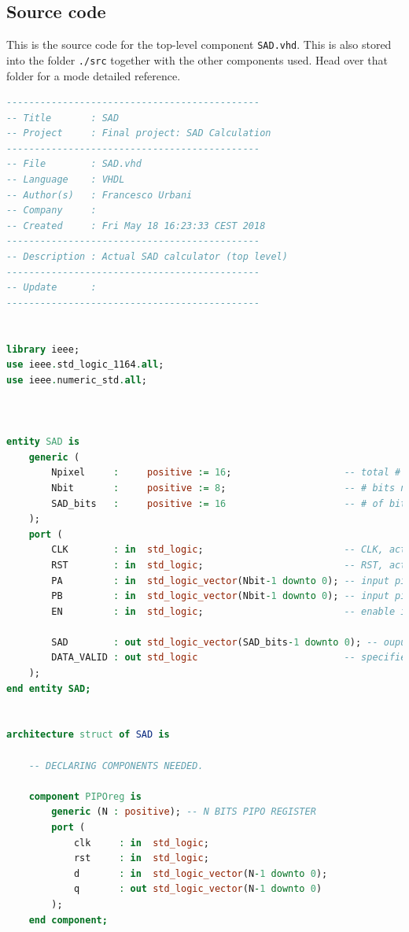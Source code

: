 \documentclass[12pt, a4paper]{article}
\begin{document}
\begin{appendices}

\section{Source code}\label{appendix:code}

This is the source code for the top-level component \texttt{SAD.vhd}. This is also stored into the folder \texttt{./src} together with the other components used. Head over that folder for a mode detailed reference.


\begin{lstlisting}[language=vhdl]
---------------------------------------------
-- Title       : SAD
-- Project     : Final project: SAD Calculation
---------------------------------------------
-- File        : SAD.vhd
-- Language    : VHDL
-- Author(s)   : Francesco Urbani
-- Company     : 
-- Created     : Fri May 18 16:23:33 CEST 2018
---------------------------------------------
-- Description : Actual SAD calculator (top level)
---------------------------------------------
-- Update      : 
---------------------------------------------


library ieee;
use ieee.std_logic_1164.all;
use ieee.numeric_std.all;



entity SAD is
	generic (
		Npixel     :     positive := 16;                    -- total # of pixels of the image
		Nbit       :     positive := 8;                     -- # bits needed to represent the value of each pixel
		SAD_bits   :     positive := 16                     -- # of bits needed to represent the output
	);
	port (
		CLK        : in  std_logic;	                        -- CLK, active on rising edge
		RST        : in  std_logic;	                        -- RST, active high
		PA         : in  std_logic_vector(Nbit-1 downto 0);	-- input pixel value image A
		PB         : in  std_logic_vector(Nbit-1 downto 0);	-- input pixel value image B
		EN         : in  std_logic;	                        -- enable input

		SAD        : out std_logic_vector(SAD_bits-1 downto 0);	-- ouput SAD value
		DATA_VALID : out std_logic	                        -- specifies whether the output SAD is valid or not
	);
end entity SAD;


architecture struct of SAD is
	
	-- DECLARING COMPONENTS NEEDED.

	component PIPOreg is
		generic (N : positive); -- N BITS PIPO REGISTER
		port (
			clk     : in  std_logic;
			rst     : in  std_logic;
			d       : in  std_logic_vector(N-1 downto 0);
			q       : out std_logic_vector(N-1 downto 0)
		);
	end component;


\end{lstlisting}
\end{appendices}
\end{document}
